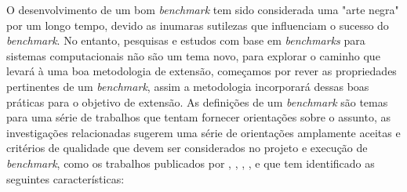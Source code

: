 O desenvolvimento de um bom \textit{benchmark} tem sido considerada uma "arte negra" por um longo tempo, devido as inumaras sutilezas que influenciam o sucesso do \textit{benchmark}. 
No entanto, pesquisas e estudos com base em \textit{benchmarks} para sistemas computacionais não são um tema novo, para explorar o caminho que levará à uma boa metodologia de extensão, começamos por rever as propriedades pertinentes de um \textit{benchmark}, assim a metodologia incorporará dessas boas práticas para o objetivo de extensão.
As definições de um \textit{benchmark} são temas para uma série de trabalhos que tentam fornecer orientações sobre o assunto, as investigações relacionadas sugerem uma série de orientações amplamente aceitas e critérios de qualidade que devem ser considerados no projeto e execução de \textit{benchmark}, como os trabalhos publicados por , , , ,  e  que tem identificado as seguintes características:


